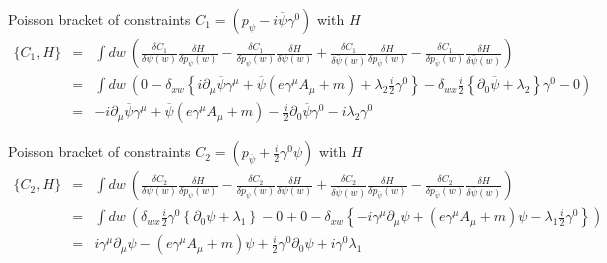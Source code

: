 \documentclass[aps,preprint,preprintnumbers,nofootinbib,showpacs,prd]{revtex4-1}
\newcommand{\nbea}{\begin{eqnarray*}}
\newcommand{\neea}{\end{eqnarray*}}
\begin{document}
Poisson bracket of constraints $C_1 = (p_\psi - i \overline \psi \gamma^0)$ with $H$
%
\nbea
\{C_1, H \} & = & \int dw~ \left ( \frac{\delta C_1}{\delta \psi(w)} \frac{\delta H}{\delta p_\psi(w)} - \frac{\delta C_1}{\delta p_\psi(w)} \frac{\delta H}{\delta \psi(w)}  + \frac{\delta C_1}{\delta \overline \psi(w)} \frac{\delta H}{\delta p_{\overline \psi}(w)} - \frac{\delta C_1}{\delta p_{\overline\psi}(w)} \frac{\delta H}{\delta \overline \psi(w)} \right ) \\
& = & \int dw~ \left ( 0 - \delta_{xw} \left \{ i \partial_\mu \overline \psi \gamma^\mu + \overline \psi \left ( e \gamma^\mu A_\mu + m\right ) + \lambda_2 \frac{i}{2}\gamma^0 \right \} - \delta_{wx} \frac{i}{2} \left \{ \partial_0 \overline\psi + \lambda_2 \right \}\gamma^0 - 0 \right ) \\
& = & - i \partial_\mu \overline \psi \gamma^\mu + \overline \psi \left ( e \gamma^\mu A_\mu + m\right ) - \frac{i}{2} \partial_0 \overline\psi \gamma^0 - i \lambda_2 \gamma^0
\neea
%

Poisson bracket of constraints $C_2 = (p_{\overline\psi} + \frac{i}{2} \gamma^0 \psi)$ with $H$
%
\nbea
\{C_2, H \} & = & \int dw~ \left ( \frac{\delta C_2}{\delta \psi(w)} \frac{\delta H}{\delta p_\psi(w)} - \frac{\delta C_2}{\delta p_\psi(w)} \frac{\delta H}{\delta \psi(w)}  + \frac{\delta C_2}{\delta \overline \psi(w)} \frac{\delta H}{\delta p_{\overline \psi}(w)} - \frac{\delta C_2}{\delta p_{\overline\psi}(w)} \frac{\delta H}{\delta \overline \psi(w)} \right ) \\
& = & \int dw~ \left ( \delta_{wx} \frac{i}{2} \gamma^0 \left \{ \partial_0 \psi + \lambda_1\right \} - 0 + 0 - \delta_{xw} \left \{ -i \gamma^\mu \partial_\mu \psi + \left ( e \gamma^\mu A_\mu + m\right )\psi - \lambda_1 \frac{i}{2} \gamma^0 \right \} \right ) \\
& = & i \gamma^\mu\partial_\mu \psi - \left ( e \gamma^\mu A_\mu + m\right )\psi + \frac{i}{2} \gamma^0 \partial_0 \psi + i \gamma^0 \lambda_1
\neea
%
\end{document}

